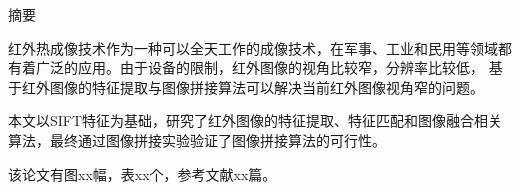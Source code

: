 \documentclass[10.5pt,a4paper]{article}
\numberwithin{equation}{section}
\numberwithin{figure}{section}
\numberwithin{table}{section}
\newcommand{\hei}{\CJKfamily{hei}}
\begin{document}
\makeatletter
\newcommand\engcontentsname{\sffamily\fontsize{18pt}{\baselineskip}\selectfont\centerline{\textbf{Contents}}}
\newcommand\tableofengcontents{%
    \if@twocolumn
      \@restonecoltrue\onecolumn
    \else
      \@restonecolfalse
    \fi
    \section*{\engcontentsname
        \@mkboth{%
           \MakeUppercase\engcontentsname}{\MakeUppercase\engcontentsname}}%
    \@starttoc{toe}%
    \if@restonecol\twocolumn\fi
    }
\newcommand\addengcontents[2]{%
    \addcontentsline{toe}{#1}{\protect\numberline{\csname the#1\endcsname}#2}}
\makeatother

\newcommand\echapter[1]{\addengcontents{chapter}{#1}}
\newcommand\esection[1]{\addengcontents{section}{#1}}
\newcommand\esubsection[1]{\addengcontents{subsection}{#1}}
\newcommand\etitlesection[1]{{\noindent\bfseries\fontsize{18pt}{\baselineskip}\selectfont\noindent\thesection\hspace{1em}#1\par\vspace{1em}}}
\newcommand\etitlesubsection[1]{{\noindent\hei\fontsize{15pt}{\baselineskip}\selectfont\thesubsection\hspace{1em}#1\par\vspace{1em}}}
\newcommand\mmx{\mathrm{x}}
\setcounter{tocdepth}{2}
{}
{\centering \hei \fontsize{18pt}{\baselineskip}\selectfont 摘\qquad 要\par}
\vspace{1em}
\fontsize{12pt}{18pt}\selectfont
红外热成像技术作为一种可以全天工作的成像技术，在军事、工业和民用等领域都有着广泛的应用。由于设备的限制，红外图像的视角比较窄，分辨率比较低，%
基于红外图像的特征提取与图像拼接算法可以解决当前红外图像视角窄的问题。\par
本文以SIFT特征为基础，研究了红外图像的特征提取、特征匹配和图像融合相关算法，最终通过图像拼接实验验证了图像拼接算法的可行性。\par
\vspace{2em}
\par
该论文有图xx幅，表xx个，参考文献xx篇。
\par
\end{document}
